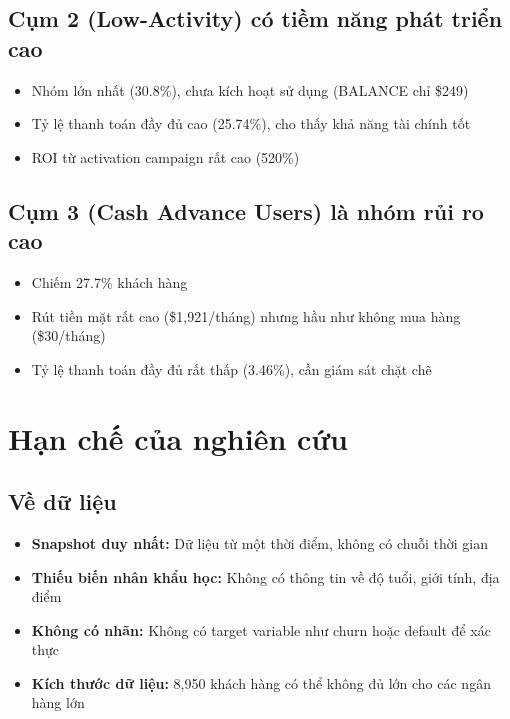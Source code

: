 \subsection{Cụm 2 (Low-Activity) có tiềm năng phát triển cao}

\begin{itemize}
    \item Nhóm lớn nhất (30.8\%), chưa kích hoạt sử dụng (BALANCE chỉ \$249)
    \item Tỷ lệ thanh toán đầy đủ cao (25.74\%), cho thấy khả năng tài chính tốt
    \item ROI từ activation campaign rất cao (520\%)
\end{itemize}

\subsection{Cụm 3 (Cash Advance Users) là nhóm rủi ro cao}

\begin{itemize}
    \item Chiếm 27.7\% khách hàng
    \item Rút tiền mặt rất cao (\$1,921/tháng) nhưng hầu như không mua hàng (\$30/tháng)
    \item Tỷ lệ thanh toán đầy đủ rất thấp (3.46\%), cần giám sát chặt chẽ
\end{itemize}

\section{Hạn chế của nghiên cứu}

\subsection{Về dữ liệu}

\begin{itemize}
    \item \textbf{Snapshot duy nhất:} Dữ liệu từ một thời điểm, không có chuỗi thời gian
    \item \textbf{Thiếu biến nhân khẩu học:} Không có thông tin về độ tuổi, giới tính, địa điểm
    \item \textbf{Không có nhãn:} Không có target variable như churn hoặc default để xác thực
    \item \textbf{Kích thước dữ liệu:} 8,950 khách hàng có thể không đủ lớn cho các ngân hàng lớn
\end{itemize}

